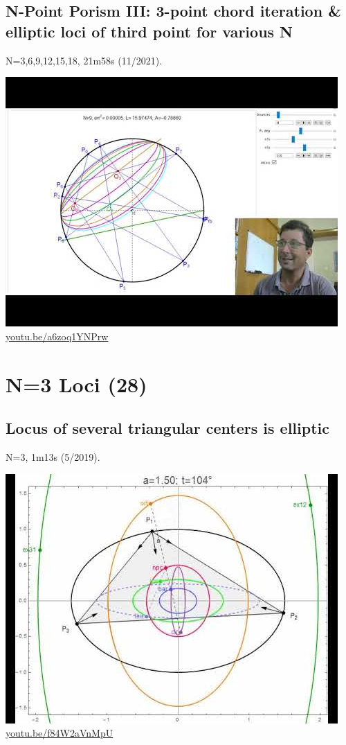 \documentclass[12pt]{amsart}
\begin{document}
\subsection{N-Point Porism III: 3-point chord iteration \& elliptic loci of third point for various N}
\label{vid:a6zoq1YNPrw}
\noindent N=3,6,9,12,15,18, 21m58s (11/2021). 
\begin{center}\includegraphics[width=.5\textwidth]{pics/a6zoq1YNPrw.jpg} \\ 
\href{https://youtu.be/a6zoq1YNPrw}{\url{youtu.be/a6zoq1YNPrw}}\end{center}
% 

\section{N=3 Loci (28)}

\subsection{Locus of several triangular centers is elliptic}
\label{vid:f84W2aVnMpU}
\noindent N=3, 1m13s (5/2019). 
\begin{center}\includegraphics[width=.5\textwidth]{pics/f84W2aVnMpU.jpg} \\ 
\href{https://youtu.be/f84W2aVnMpU}{\url{youtu.be/f84W2aVnMpU}}\end{center}
% 
\end{document}
